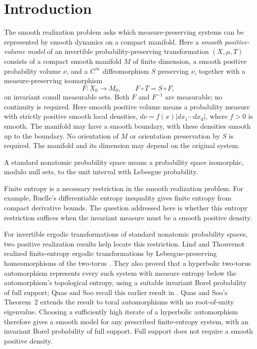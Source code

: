 \section{Introduction}\label{sec:introduction}

The smooth realization problem asks which measure-preserving systems can
be represented by smooth dynamics on a compact manifold.
Here a \emph{smooth positive-volume model} of an invertible
probability-preserving transformation $(X,\mu,T)$ consists of a compact
smooth manifold $M$ of finite dimension, a smooth positive probability
volume $\nu$, and a $C^\infty$ diffeomorphism $S$ preserving $\nu$,
together with a measure-preserving isomorphism
\[
 F:X_0\longrightarrow M_0,\qquad F\circ T=S\circ F,
\]
on invariant conull measurable sets. Both $F$ and $F^{-1}$ are measurable;
no continuity is required. Here smooth positive volume means a probability
measure with strictly positive smooth local densities,
$d\nu=f(x)|dx_1\cdots dx_d|$, where $f>0$ is smooth.
The manifold may have a smooth boundary, with these densities smooth up
to the boundary. No orientation of $M$ or orientation preservation by
$S$ is required. The manifold and its dimension may depend on the
original system.

A standard nonatomic probability space means a probability space
isomorphic, modulo null sets, to the unit interval with Lebesgue
probability.

Finite entropy is a necessary restriction in the smooth realization
problem. For example, Ruelle's differentiable entropy inequality
\cite[Theorem~2]{Ruelle1978} gives finite entropy from compact derivative
bounds. The question addressed here is
whether this entropy restriction suffices when the invariant measure
must be a smooth positive density.

For invertible ergodic transformations of standard nonatomic
probability spaces, two positive realization results help locate this
restriction.
Lind and Thouvenot realized finite-entropy ergodic transformations by
Lebesgue-preserving homeomorphisms of the two-torus
\cite{LindThouvenot1977}. They also proved that a hyperbolic
two-torus automorphism represents every such system with measure entropy
below the automorphism's topological entropy, using a suitable invariant
Borel probability of full support; Quas and Soo recall this earlier result in
\cite[\S1]{QuasSoo2016}. Quas and Soo's Theorem~2 extends the result to
toral automorphisms with no root-of-unity eigenvalue.
Choosing a sufficiently high iterate of a hyperbolic automorphism
therefore gives a smooth model for any prescribed finite-entropy
system, with an invariant Borel probability of full support.
Full support does not require a smooth positive density.


